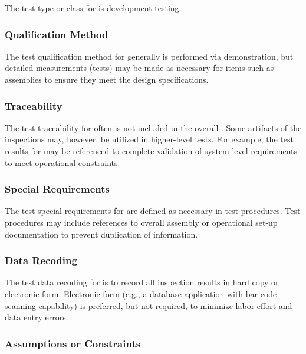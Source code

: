 The test type or class for \TestIdNameX is development testing.

\subsubsection{Qualification Method}
\label{loc:TestQualificationMethod\TestIdName}

The test qualification method for \TestIdNameX generally is performed via demonstration, but detailed measurements (tests) may be made as necessary for items such as \PWB  assemblies to ensure they meet the design specifications.

\subsubsection{Traceability}
\label{loc:TestTraceability\TestIdName}

The test traceability for \TestIdNameX often is not included in the overall \RTVM.
Some artifacts of the \TestIdNameX inspections may, however, be utilized in higher-level tests.
For example, the test results for \PWBs may be referenced to complete validation of system-level requirements to meet operational constraints.

\subsubsection{Special Requirements}
\label{loc:TestSpecialRequirements\TestIdName}

The test special requirements for \TestIdNameX are defined as necessary in test procedures.
Test procedures may include references to overall assembly or operational set-up documentation to prevent duplication of information.


\subsubsection{Data Recoding}
\label{loc:TestDataRecoding\TestIdName}

The test data recoding for \TestIdNameX is to record all inspection results in hard copy or electronic form.
Electronic form (e.g., a database application with bar code scanning capability) is preferred, but not required, to minimize labor effort and data entry errors.

\subsubsection{Assumptions or Constraints}
\label{loc:TestAssumptionsOrConstraints\TestIdName}

